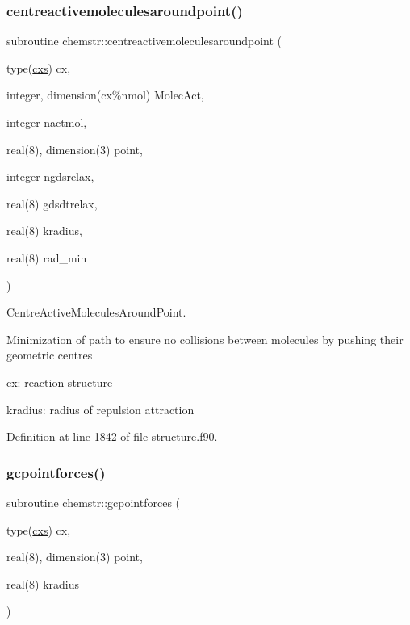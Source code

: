 \subsubsection{\texorpdfstring{centreactivemoleculesaroundpoint()}{centreactivemoleculesaroundpoint()}}
{\footnotesize\ttfamily subroutine chemstr\+::centreactivemoleculesaroundpoint (\begin{DoxyParamCaption}\item[{type(\mbox{\hyperlink{structchemstr_1_1cxs}{cxs}})}]{cx,  }\item[{integer, dimension(cx\%nmol)}]{Molec\+Act,  }\item[{integer}]{nactmol,  }\item[{real(8), dimension(3)}]{point,  }\item[{integer}]{ngdsrelax,  }\item[{real(8)}]{gdsdtrelax,  }\item[{real(8)}]{kradius,  }\item[{real(8)}]{rad\+\_\+min }\end{DoxyParamCaption})}



Centre\+Active\+Molecules\+Around\+Point. 

Minimization of path to ensure no collisions between molecules by pushing their geometric centres


\begin{DoxyItemize}
\item cx\+: reaction structure
\item kradius\+: radius of repulsion attraction 
\end{DoxyItemize}

Definition at line 1842 of file structure.\+f90.

\mbox{\label{namespacechemstr_aacd6e15b4920ee661af0964754a972ca}} 
\subsubsection{\texorpdfstring{gcpointforces()}{gcpointforces()}}
{\footnotesize\ttfamily subroutine chemstr\+::gcpointforces (\begin{DoxyParamCaption}\item[{type(\mbox{\hyperlink{structchemstr_1_1cxs}{cxs}})}]{cx,  }\item[{real(8), dimension(3)}]{point,  }\item[{real(8)}]{kradius }\end{DoxyParamCaption})}



